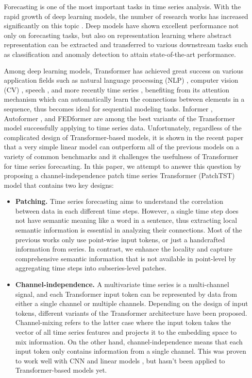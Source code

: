 \documentclass{article} %
\begin{document}
Forecasting is one of the most important tasks in time series analysis. With the rapid growth of deep learning models, the number of research works has increased significantly on this topic \citep{survey1,survey2,survey3}. Deep models have shown excellent performance not only on forecasting tasks, but also on representation learning where abstract representation can be extracted and transferred to various downstream tasks such as classification and anomaly detection to attain state-of-the-art performance.

Among deep learning models, Transformer has achieved great success on various application fields such as natural language processing (NLP) \citep{nlpsurvey}, computer vision (CV) \citep{cvsurvey}, speech \citep{speechsurvey}, and more recently time series \citep{tssurvey}, benefiting from its attention mechanism which can automatically learn the connections between elements in a sequence, thus becomes ideal for sequential modeling tasks. Informer \citep{informer}, Autoformer \citep{autoformer}, and FEDformer \citep{fedformer} are among the best variants of the Transformer model successfully applying to time series data. Unfortunately, regardless of the complicated design of Transformer-based models, it is shown in the recent paper \citep{dlinear} that a very simple linear model can outperform all of the previous models on a variety of common benchmarks and it challenges the usefulness of Transformer for time series forecasting. In this paper, we attempt to answer this question by proposing a channel-independence patch time series Transformer (PatchTST) model that contains two key designs:

\begin{itemize}[leftmargin= 20 pt,itemsep= 5 pt,topsep = 5 pt]
    \item \textbf{Patching.} Time series forecasting aims to understand the correlation between data in each different time steps. However, a single time step does not have semantic meaning like a word in a sentence, thus extracting local semantic information is essential in analyzing their connections. Most of the previous works only use point-wise input tokens, or just a handcrafted information from series. In contrast, we enhance the locality and capture comprehensive semantic information that is not available in point-level by aggregating time steps into subseries-level patches.
    
    \item \textbf{Channel-independence.} A multivariate time series is a multi-channel signal, and each Transformer input token can be represented by data from either a single channel or multiple channels. Depending on the design of input tokens, different variants of the Transformer architecture have been proposed. Channel-mixing refers to the latter case where the input token takes the vector of all time series features and projects it to the embedding space to mix information. On the other hand, channel-independence means that each input token only contains information from a single channel. This was proven to work well with CNN \citep{multichannel} and linear models \citep{dlinear}, but hasn't been applied to Transformer-based models yet.
\end{itemize}
\end{document}
